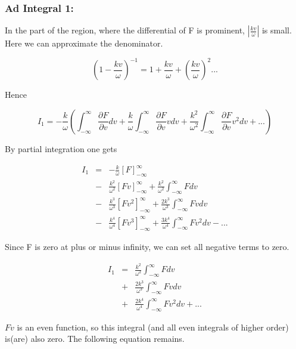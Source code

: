\documentclass[a4paper,10pt]{report}
\begin{document}
\subsubsection{Ad Integral 1:}

In the part of the region, where the differential of F is prominent, $|\frac{k v}{\omega}|$ is small. Here we can approximate the denominator.

\begin{equation}
\left( 1-\frac{k v}{\omega} \right)^{-1}=1+ \frac{k v}{\omega} + \left( \frac{k v}{\omega} \right)^2 ...
\end{equation}

Hence

\begin{equation}
    I_1=-\frac{k}{\omega} \left( \int^{\infty}_{-\infty } {\frac{\partial F}{\partial v}dv } + \frac{k}{\omega}\int^{\infty}_{-\infty } {\frac{\partial F}{\partial v} v dv }  + \frac{k^2}{\omega^2}\int^{\infty}_{-\infty } {\frac{\partial F}{\partial v} v^2 dv } + ...\right)
\end{equation}

By partial integration one gets

\begin{eqnarray}
    I_1&=&-\frac{k}{\omega} \left[ F \right]^{\infty}_{-\infty } \\
    &-& \frac{k^2}{\omega^2} \left[ F v \right]^{\infty}_{-\infty } +  \frac{k^2}{\omega^2} \int^{\infty}_{-\infty } F dv \nonumber \\
&-& \frac{k^3}{\omega^3} \left[ F v^2 \right]^{\infty}_{-\infty } +  \frac{2 k^3}{\omega^3} \int^{\infty}_{-\infty } Fv dv \nonumber \\
&-& \frac{k^4}{\omega ^4} \left[ F v^3 \right]^{\infty}_{-\infty } +  \frac{3 k^4}{\omega^4} \int^{\infty}_{-\infty } Fv^2 dv - ... \nonumber
\end{eqnarray}

Since F is zero at plus or minus infinity, we can set all negative terms to zero.

\begin{eqnarray}
    I_1&=& \frac{k^2}{\omega^2} \int^{\infty}_{-\infty } F dv  \\
&+& \frac{2 k^3}{\omega^3} \int^{\infty}_{-\infty } Fv dv \nonumber \\
&+&   \frac{2 k^4}{\omega^4} \int^{\infty}_{-\infty } Fv^2 dv + ...\nonumber
\end{eqnarray}

$Fv$ is an even function, so this integral (and all even integrals of higher order) is(are) also zero. The following equation remains.
\end{document}
